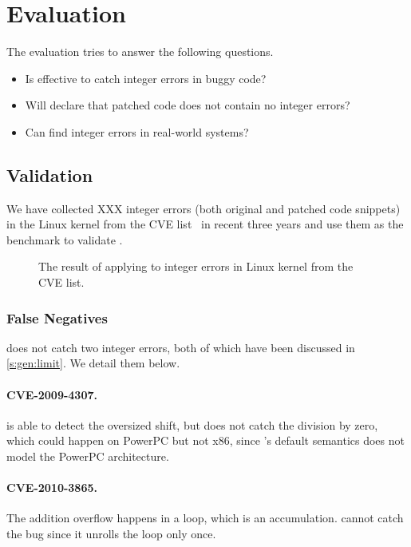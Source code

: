 \section{Evaluation}
\label{s:eval}

The evaluation tries to answer the following questions.
\begin{itemize}
\item
Is \sys effective to catch integer errors in buggy code?
\item
Will \sys declare that patched code does not contain no integer errors?
\item
Can \sys find integer errors in real-world systems?
\end{itemize}

\subsection{Validation}

We have collected XXX integer errors (both original and patched
code snippets) in the Linux kernel from the CVE list~\cite{cve} in
recent three years and use them as the benchmark to validate \sys.

\newcommand{\ok}{\textcolor{JungleGreen}{\checkmark}\xspace}
\newcommand{\checked}{$\boxtimes$}
\begin{figure*}
\centering
\footnotesize

\caption{The result of applying \sys to integer errors in Linux
kernel from the CVE list.}
\end{figure*}

\subsubsection{False Negatives}

\sys does not catch two integer errors, both of which have been
discussed in \autoref{s:gen:limit}.  We detail them below.


\paragraph{CVE-2009-4307.}
\sys is able to detect the oversized shift, but does not catch the
division by zero, which could happen on PowerPC but not x86, since
\sys's default semantics does not model the PowerPC architecture.

\paragraph{CVE-2010-3865.}
The addition overflow happens in a loop, which is an accumulation.
\sys cannot catch the bug since it unrolls the loop only once.

